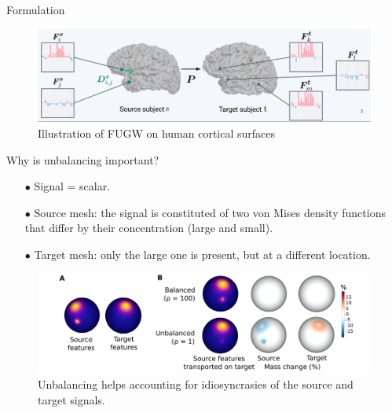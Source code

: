 \documentclass{beamer}
\begin{document}
\begin{frame}{Formulation}
\vspace{-0.5cm}
\begin{figure}
  \centering
  \includegraphics[width=1.\linewidth, keepaspectratio=true]{OT_new/fugw.png}
  \caption*{\scriptsize{Illustration of FUGW on human cortical surfaces}}
\end{figure}
\end{frame}

\begin{frame}{Why is unbalancing important?}
\scriptsize
\begin{itemize}
  \item[$\bullet$] Signal = scalar.
  \item[$\bullet$] Source mesh: the signal is constituted of two von Mises
  density functions that differ by their concentration (large and small).
  \item[$\bullet$] Target mesh: only the large one is present, but at a different location.
\end{itemize}
\vspace{0.2cm}
\begin{figure}
  \centering
  \includegraphics[width=1.\linewidth, keepaspectratio=true]{OT_new/toy_example.pdf}
  \caption*{\scriptsize{Unbalancing helps accounting for idiosyncrasies of the source and target signals.}}
\end{figure}


\end{frame}
\end{document}
